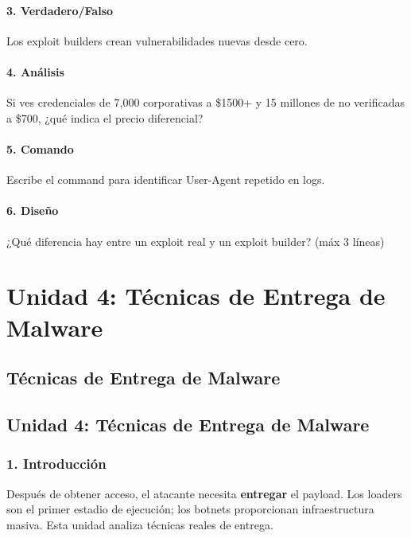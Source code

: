 \documentclass[
  letterpaper,
]{report}
\begin{document}
\subsection{3. Verdadero/Falso}\label{verdaderofalso-1}

Los exploit builders crean vulnerabilidades nuevas desde cero.

\subsection{4. Análisis}\label{anuxe1lisis-1}

Si ves credenciales de 7,000 corporativas a \$1500+ y 15 millones de no
verificadas a \$700, ¿qué indica el precio diferencial?

\subsection{5. Comando}\label{comando-1}

Escribe el command para identificar User-Agent repetido en logs.

\subsection{6. Diseño}\label{diseuxf1o}

¿Qué diferencia hay entre un exploit real y un exploit builder? (máx 3
líneas)

\part{Unidad 4: Técnicas de Entrega de Malware}

\chapter{Técnicas de Entrega de
Malware}\label{tuxe9cnicas-de-entrega-de-malware}

\chapter{Unidad 4: Técnicas de Entrega de
Malware}\label{unidad-4-tuxe9cnicas-de-entrega-de-malware-1}

\section{1. Introducción}\label{introducciuxf3n-3}

Después de obtener acceso, el atacante necesita \textbf{entregar} el
payload. Los loaders son el primer estadio de ejecución; los botnets
proporcionan infraestructura masiva. Esta unidad analiza técnicas reales
de entrega.
\end{document}
